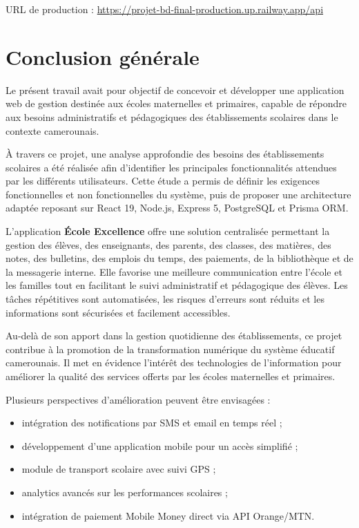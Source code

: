\documentclass[12pt, a4paper]{report}
\begin{document}
URL de production : \url{https://projet-bd-final-production.up.railway.app/api}

\chapter*{Conclusion générale}

Le présent travail avait pour objectif de concevoir et développer une application web de gestion destinée aux écoles maternelles et primaires, capable de répondre aux besoins administratifs et pédagogiques des établissements scolaires dans le contexte camerounais.

À travers ce projet, une analyse approfondie des besoins des établissements scolaires a été réalisée afin d'identifier les principales fonctionnalités attendues par les différents utilisateurs. Cette étude a permis de définir les exigences fonctionnelles et non fonctionnelles du système, puis de proposer une architecture adaptée reposant sur React 19, Node.js, Express 5, PostgreSQL et Prisma ORM.

L'application \textbf{École Excellence} offre une solution centralisée permettant la gestion des élèves, des enseignants, des parents, des classes, des matières, des notes, des bulletins, des emplois du temps, des paiements, de la bibliothèque et de la messagerie interne. Elle favorise une meilleure communication entre l'école et les familles tout en facilitant le suivi administratif et pédagogique des élèves. Les tâches répétitives sont automatisées, les risques d'erreurs sont réduits et les informations sont sécurisées et facilement accessibles.

Au-delà de son apport dans la gestion quotidienne des établissements, ce projet contribue à la promotion de la transformation numérique du système éducatif camerounais. Il met en évidence l'intérêt des technologies de l'information pour améliorer la qualité des services offerts par les écoles maternelles et primaires.

Plusieurs perspectives d'amélioration peuvent être envisagées :
\begin{itemize}[noitemsep]
    \item intégration des notifications par SMS et email en temps réel ;
    \item développement d'une application mobile pour un accès simplifié ;
    \item module de transport scolaire avec suivi GPS ;
    \item analytics avancés sur les performances scolaires ;
    \item intégration de paiement Mobile Money direct via API Orange/MTN.
\end{itemize}
\end{document}
